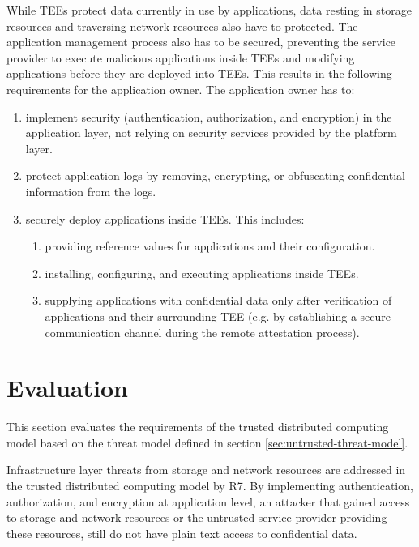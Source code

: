 While TEEs protect data currently in use by applications, data resting in
storage resources and traversing network resources also have to protected. The
application management process also has to be secured, preventing the service
provider to execute malicious applications inside TEEs and modifying
applications before they are deployed into TEEs. This results in the following
requirements for the application owner. The application owner has to:

\begin{enumerate}[resume,label*=R\arabic*]
  \item implement security (authentication, authorization, and encryption) in
        the application layer, not relying on security services provided by the
        platform layer.
  \item protect application logs by removing, encrypting, or obfuscating
        confidential information from the logs.
  \item securely deploy applications inside TEEs. This includes:
        \begin{enumerate}[label*=.\arabic*]
          \item providing reference values for applications and their
                configuration.
          \item installing, configuring, and executing applications inside TEEs.
          \item supplying applications with confidential data only after
                verification of applications and their surrounding TEE (e.g. by
                establishing a secure communication channel during the remote
                attestation process).
        \end{enumerate}
\end{enumerate}


\section{Evaluation}
\label{sec:evaluation}

This section evaluates the requirements of the trusted distributed computing
model based on the threat model defined in section
\ref{sec:untrusted-threat-model}.

Infrastructure layer threats from storage and network resources are addressed in
the trusted distributed computing model by R7. By implementing authentication,
authorization, and encryption at application level, an attacker that gained
access to storage and network resources or the untrusted service provider
providing these resources, still do not have plain text access to confidential
data.

